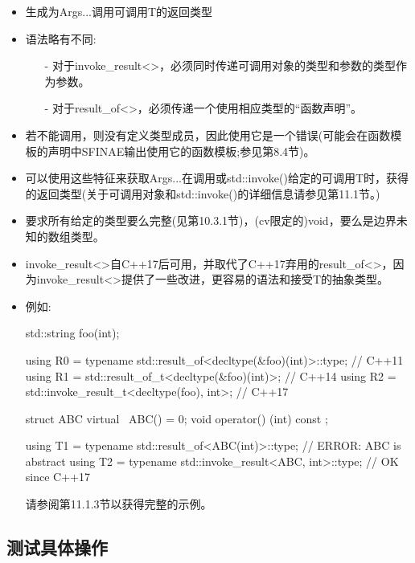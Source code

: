 \begin{itemize}
\item 
生成为Args...调用可调用T的返回类型

\item 
语法略有不同:

\begin{itemize}
\item [-]
对于invoke\_result<>，必须同时传递可调用对象的类型和参数的类型作为参数。

\item [-]
对于result\_of<>，必须传递一个使用相应类型的“函数声明”。
\end{itemize}

\item 
若不能调用，则没有定义类型成员，因此使用它是一个错误(可能会在函数模板的声明中SFINAE输出使用它的函数模板;参见第8.4节)。

\item 
可以使用这些特征来获取Args...在调用或std::invoke()给定的可调用T时，获得的返回类型(关于可调用对象和std::invoke()的详细信息请参见第11.1节。)

\item 
要求所有给定的类型要么完整(见第10.3.1节)，(cv限定的)void，要么是边界未知的数组类型。

\item 
invoke\_result<>自C++17后可用，并取代了C++17弃用的result\_of<>，因为invoke\_result<>提供了一些改进，更容易的语法和接受T的抽象类型。

\item 
例如:
\begin{cpp}
std::string foo(int);

using R0 = typename std::result_of<decltype(&foo)(int)>::type; // C++11
using R1 = std::result_of_t<decltype(&foo)(int)>; // C++14
using R2 = std::invoke_result_t<decltype(foo), int>; // C++17

struct ABC {
	virtual ~ABC() = 0;
	void operator() (int) const {
	}
};

using T1 = typename std::result_of<ABC(int)>::type; // ERROR: ABC is abstract
using T2 = typename std::invoke_result<ABC, int>::type; // OK since C++17
\end{cpp}

请参阅第11.1.3节以获得完整的示例。

\end{itemize}

\newpage

\subsection{测试具体操作}

